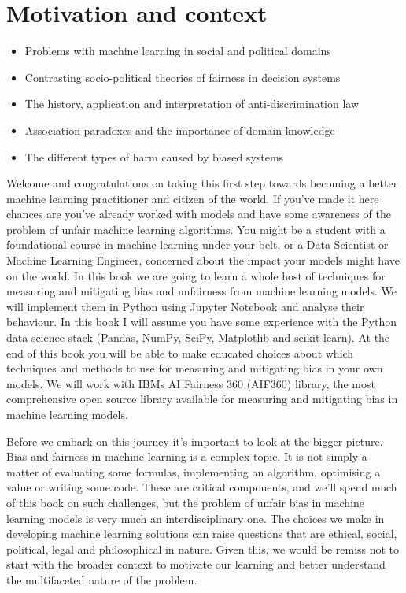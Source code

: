 \chapter[Background]{Motivation and context}\label{ch_Background}

\begin{chapsumm}
\begin{itemize}
\item Problems with machine learning in social and political domains
\item Contrasting socio-political theories of fairness in decision systems
\item The history, application and interpretation of anti-discrimination law
\item Association paradoxes and the importance of domain knowledge
\item The different types of harm caused by biased systems
\end{itemize}
\end{chapsumm}
%
\noindent
%
Welcome and congratulations on taking this first step towards becoming a better machine learning practitioner and citizen of the world. If you've made it here chances are you've already worked with models and have some awareness of the problem of unfair machine learning algorithms. You might be a student with a foundational course in machine learning under your belt, or a Data Scientist or Machine Learning Engineer, concerned about the impact your models might have on the world. In this book we are going to learn a whole host of techniques for measuring and mitigating bias and unfairness from machine learning models. We will implement them in Python using Jupyter Notebook and analyse their behaviour. In this book I will assume you have some experience with the Python data science stack (Pandas, NumPy, SciPy, Matplotlib and scikit-learn). At the end of this book you will be able to make educated choices about which techniques and methods to use for measuring and mitigating bias in your own models. We will work with IBMs AI Fairness 360 (AIF360) library, the most comprehensive open source library  available for measuring and mitigating bias in machine learning models.

Before we embark on this journey it's important to look at the bigger picture. Bias and fairness in machine learning is a complex topic. It is not simply a matter of evaluating some formulas, implementing an algorithm, optimising a value or writing some code. These are critical components, and we'll spend much of this book on such challenges, but the problem of unfair bias in machine learning models is very much an interdisciplinary one. The choices we make in developing machine learning solutions can raise questions that are ethical, social, political, legal and philosophical in nature. Given this, we would be remiss not to start with the broader context to motivate our learning and better understand the multifaceted nature of the problem.

